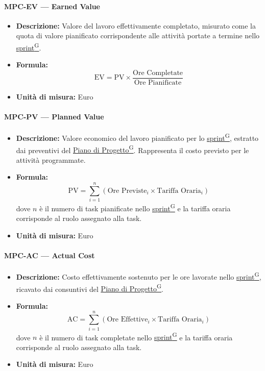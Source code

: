 \documentclass[a4paper,12pt]{article}
\providecommand{\glslink}[2]{\href{https://alittlebyte-19.github.io/Documentazione/glossario.html\#gls-#1}{\underline{#2}\textsuperscript{\scriptsize G}}}
\begin{document}
\paragraph{MPC-EV --- Earned Value}
\begin{itemize}
    \item \textbf{Descrizione:} Valore del lavoro effettivamente completato, misurato come la quota di valore pianificato corrispondente alle attività portate a termine nello \glslink{sprint}{sprint}.
    \item \textbf{Formula:}
    $$\text{EV} = \text{PV} \times \frac{\text{Ore Completate}}{\text{Ore Pianificate}}$$
    \item \textbf{Unità di misura:} Euro
\end{itemize}

\paragraph{MPC-PV --- Planned Value}
\begin{itemize}
    \item \textbf{Descrizione:} Valore economico del lavoro pianificato per lo \glslink{sprint}{sprint}, estratto dai preventivi del \glslink{piano-di-progetto}{Piano di Progetto}. Rappresenta il costo previsto per le attività programmate.
    \item \textbf{Formula:}
    $$\text{PV} = \sum_{i=1}^{n} (\text{Ore Previste}_i \times \text{Tariffa Oraria}_i)$$
    dove $n$ è il numero di task pianificate nello \glslink{sprint}{sprint} e la tariffa oraria corrisponde al ruolo assegnato alla task.
    \item \textbf{Unità di misura:} Euro
\end{itemize}

\paragraph{MPC-AC --- Actual Cost}
\begin{itemize}
    \item \textbf{Descrizione:} Costo effettivamente sostenuto per le ore lavorate nello \glslink{sprint}{sprint}, ricavato dai consuntivi del \glslink{piano-di-progetto}{Piano di Progetto}.
    \item \textbf{Formula:}
    $$\text{AC} = \sum_{i=1}^{n} (\text{Ore Effettive}_i \times \text{Tariffa Oraria}_i)$$
    dove $n$ è il numero di task completate nello \glslink{sprint}{sprint} e la tariffa oraria corrisponde al ruolo assegnato alla task.
    \item \textbf{Unità di misura:} Euro
\end{itemize}
\end{document}
